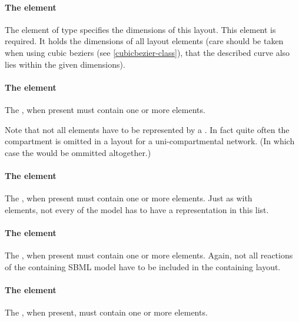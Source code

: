 \paragraph{The  element}
The  element of type \Dimensions specifies the 
dimensions of this layout. This element is required. It holds the 
dimensions of all layout elements (care should be taken when using cubic 
beziers (see \ref{cubicbezier-class}), that the described curve also lies 
within the given dimensions). 


\paragraph{The  element}
\label{listofcompartmentglyphs-class}
The , when present must contain one or 
more \CompartmentGlyph elements. 

Note that not all \Compartment elements have to be represented by a 
\CompartmentGlyph. In fact quite often the compartment is omitted 
in a layout for a uni-compartmental network. (In which case the 
\ListOfCompartmentGlyphs would be ommitted altogether.)


\paragraph{The  element}
\label{listofspeciesglyphs-class}
The , when present must contain 
one or more \SpeciesGlyph elements. Just as with \\ \CompartmentGlyph 
elements, not every \Species of the model has to have a representation 
in this list.


\paragraph{The  element}
\label{listofreactionglyphs-class}
The , when present must contain one or more 
\ReactionGlyph elements. Again, not all reactions of the containing SBML 
model have to be included in the containing layout. 


\paragraph{The  element}
\label{listoftextglyphs-class}
The , when present, must contain one or more 
\TextGlyph elements. 


